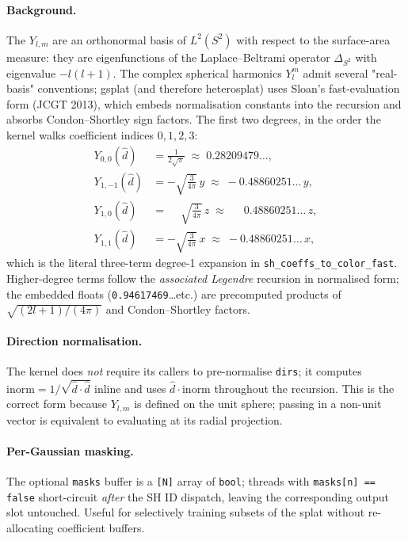 \documentclass[11pt]{article}
\begin{document}
\paragraph{Background.}
The $Y_{l,m}$ are an orthonormal basis of $L^{2}(S^{2})$ with respect
to the surface-area measure: they are eigenfunctions of the
Laplace--Beltrami operator $\Delta_{S^{2}}$ with eigenvalue $-l(l+1)$.
The complex spherical harmonics $Y_{l}^{m}$ admit several "real-basis"
conventions; gsplat (and therefore heterosplat) uses Sloan's
fast-evaluation form (JCGT 2013), which embeds normalisation
constants into the recursion and absorbs Condon--Shortley sign
factors. The first two degrees, in the order the kernel walks
coefficient indices $0, 1, 2, 3$:
\begin{align}
  Y_{0,0}(\hat d) &= \tfrac{1}{2\sqrt{\pi}} \;\approx\; 0.28209479\dots, \\
  Y_{1,-1}(\hat d) &= -\sqrt{\tfrac{3}{4\pi}}\, y \;\approx\; -0.48860251\dots\, y, \\
  Y_{1,0}(\hat d)  &= \phantom{-}\sqrt{\tfrac{3}{4\pi}}\, z \;\approx\; \phantom{-}0.48860251\dots\, z, \\
  Y_{1,1}(\hat d)  &= -\sqrt{\tfrac{3}{4\pi}}\, x \;\approx\; -0.48860251\dots\, x,
\end{align}
which is the literal three-term degree-1 expansion in
\texttt{sh\_coeffs\_to\_color\_fast}. Higher-degree terms follow the
\emph{associated Legendre} recursion in normalised form; the
embedded floats (\texttt{0.94617469}\dots etc.) are precomputed
products of $\sqrt{(2l+1)/(4\pi)}$ and Condon--Shortley factors.

\paragraph{Direction normalisation.}
The kernel does \emph{not} require its callers to pre-normalise
\texttt{dirs}; it computes
$\text{inorm} = 1 / \sqrt{\hat d \cdot \hat d}$ inline and uses
$\hat d \cdot \text{inorm}$ throughout the recursion. This is the
correct form because $Y_{l,m}$ is defined on the unit sphere; passing
in a non-unit vector is equivalent to evaluating at its radial
projection.

\paragraph{Per-Gaussian masking.}
The optional \texttt{masks} buffer is a \texttt{[N]} array of
\texttt{bool}; threads with \texttt{masks[n] == false} short-circuit
\emph{after} the SH ID dispatch, leaving the corresponding output
slot untouched. Useful for selectively training subsets of the
splat without re-allocating coefficient buffers.
\end{document}
